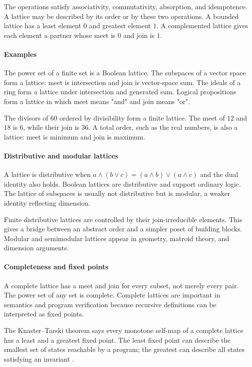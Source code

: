 The operations satisfy associativity, commutativity, absorption, and idempotence. A lattice may be described by its order or by these two operations. A bounded lattice has a least element $0$ and greatest element $1$. A complemented lattice gives each element a partner whose meet is $0$ and join is $1$.

\paragraph{Examples}
The power set of a finite set is a Boolean lattice. The subspaces of a vector space form a lattice: meet is intersection and join is vector-space sum. The ideals of a ring form a lattice under intersection and generated sum. Logical propositions form a lattice in which meet means "and" and join means "or".

The divisors of $60$ ordered by divisibility form a finite lattice. The meet of $12$ and $18$ is $6$, while their join is $36$. A total order, such as the real numbers, is also a lattice: meet is minimum and join is maximum.

\paragraph{Distributive and modular lattices}
A lattice is distributive when $a\wedge(b\vee c)=(a\wedge b)\vee(a\wedge c)$ and the dual identity also holds. Boolean lattices are distributive and support ordinary logic. The lattice of subspaces is usually not distributive but is modular, a weaker identity reflecting dimension.

Finite distributive lattices are controlled by their join-irreducible elements. This gives a bridge between an abstract order and a simpler poset of building blocks. Modular and semimodular lattices appear in geometry, matroid theory, and dimension arguments.

\paragraph{Completeness and fixed points}
A complete lattice has a meet and join for every subset, not merely every pair. The power set of any set is complete. Complete lattices are important in semantics and program verification because recursive definitions can be interpreted as fixed points.

The Knaster--Tarski theorem says every monotone self-map of a complete lattice has a least and a greatest fixed point. The least fixed point can describe the smallest set of states reachable by a program; the greatest can describe all states satisfying an invariant \cite{lattice_theory_ref2}.

